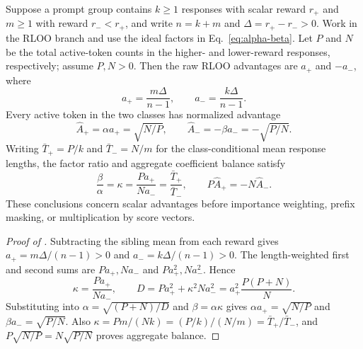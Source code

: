 \begin{proposition}
\label{prop:binary-rloo-normalization}
Suppose a prompt group contains $k\ge1$ responses with scalar reward $r_+$
and $m\ge1$ with reward $r_-<r_+$, and write $n=k+m$ and
$\Delta=r_+-r_->0$. Work in the RLOO branch and use the ideal factors in
Eq.~\eqref{eq:alpha-beta}. Let $P$ and $N$ be the total active-token counts
in the higher- and lower-reward responses, respectively; assume $P,N>0$.
Then the raw RLOO advantages are $a_+$ and $-a_-$, where
\[
    a_+=\frac{m\Delta}{n-1},\qquad
    a_-=\frac{k\Delta}{n-1}.
\]
Every active token in the two classes has normalized advantage
\begin{equation}
    \hat A_+=\alpha a_+=\sqrt{N/P},\qquad
    \hat A_-=-\beta a_-=-\sqrt{P/N}.
    \label{eq:binary-normalized-amplitudes}
\end{equation}
Writing $\bar T_+=P/k$ and $\bar T_-=N/m$ for the class-conditional mean
response lengths, the factor ratio and aggregate coefficient balance satisfy
\begin{equation}
    \frac{\beta}{\alpha}=\kappa
      =\frac{Pa_+}{Na_-}=\frac{\bar T_+}{\bar T_-},\qquad
    P\hat A_+=-N\hat A_-.
    \label{eq:binary-length-balance}
\end{equation}
These conclusions concern scalar advantages before importance weighting,
prefix masking, or multiplication by score vectors.
\end{proposition}
\begin{proof}[Proof of ]
Subtracting the sibling mean from each reward gives
$a_+=m\Delta/(n-1)>0$ and $a_-=k\Delta/(n-1)>0$.
The length-weighted first and second sums are $Pa_+,Na_-$ and
$Pa_+^2,Na_-^2$. Hence
\[
 \kappa=\frac{Pa_+}{Na_-},\qquad
 D=Pa_+^2+\kappa^2Na_-^2=a_+^2\frac{P(P+N)}{N}.
\]
Substituting into $\alpha=\sqrt{(P+N)/D}$ and $\beta=\alpha\kappa$
gives $\alpha a_+=\sqrt{N/P}$ and $\beta a_-=\sqrt{P/N}$.
Also $\kappa=Pm/(Nk)=(P/k)/(N/m)=\bar T_+/\bar T_-$, and
$P\sqrt{N/P}=N\sqrt{P/N}$ proves aggregate balance.
\end{proof}

